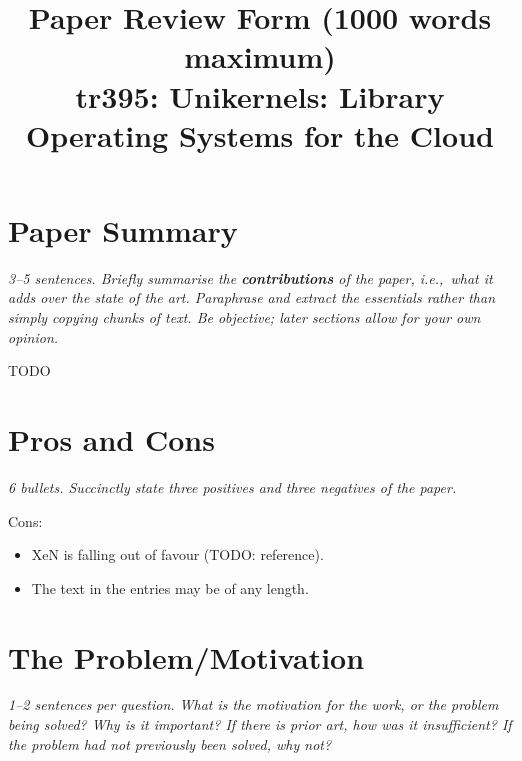 \documentclass[11pt]{article}
\begin{document}
\title{Paper Review Form (1000 words maximum)\\
    tr395: Unikernels: Library Operating Systems for the Cloud \cite{Unikernels}}

\maketitle

\section*{Paper Summary}

\textsl{3--5 sentences. Briefly summarise the {\bf contributions} of the paper,
i.e.,~what it adds over the state of the art. Paraphrase and extract the
essentials rather than simply copying chunks of text. Be objective; later
sections allow for your own opinion.} %

TODO


\section*{Pros and Cons}

\textsl{6 bullets. Succinctly state three positives and three negatives of the
paper.} %


Cons:

\begin{itemize}

    \item XeN is falling out of favour (TODO: reference).



    \item The text in the entries may be of any length.

\end{itemize}


\section*{The Problem/Motivation}

\textsl{1--2 sentences per question. What is the motivation for the work, or the problem being solved? Why is it important? If there is prior art, how was it insufficient? If the problem had not previously been solved, why not?}
\end{document}
